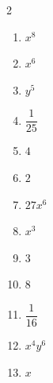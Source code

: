 \documentclass[11pt]{article}
\begin{document}
\begin{keybox}
\begin{multicols}{2}
\small
\begin{enumerate}[leftmargin=*,itemsep=3pt]
  \item $x^8$
  \item $x^6$
  \item $y^5$
  \item $\dfrac{1}{25}$
  \item $4$
  \item $2$
  \item $27x^6$
  \item $x^3$
  \item $3$
  \item $8$
  \item $\dfrac{1}{16}$
  \item $x^4 y^6$
  \item $x$
\end{enumerate}
\end{multicols}
\end{keybox}
\end{document}
